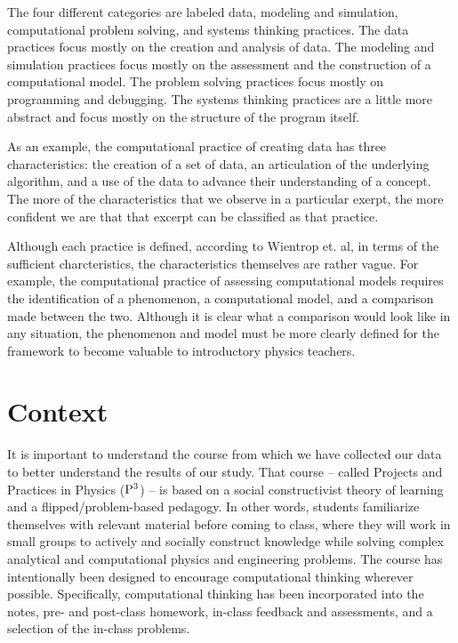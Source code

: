\documentclass{msuphddissertation}
\begin{document}
\begin{doublespace}
The four different categories are labeled data, modeling and simulation, computational problem solving, and systems thinking practices.  The data practices focus mostly on the creation and analysis of data.  The modeling and simulation practices focus mostly on the assessment and the construction of a computational model.  The problem solving practices focus mostly on programming and debugging.  The systems thinking practices are a little more abstract and focus mostly on the structure of the program itself.

As an example, the computational practice of creating data has three characteristics: the creation of a set of data, an articulation of the underlying algorithm, and a use of the data to advance their understanding of a concept.  The more of the characteristics that we observe in a particular exerpt, the more confident we are that that excerpt can be classified as that practice.

Although each practice is defined, according to Wientrop et. al, in terms of the sufficient charcteristics, the characteristics themselves are rather vague.  For example, the computational practice of assessing computational models requires the identification of a phenomenon, a computational model, and a comparison made between the two.  Although it is clear what a comparison would look like in any situation, the phenomenon and model must be more clearly defined for the framework to become valuable to introductory physics teachers.

%
%

\chapter{Context}\label{CH3:Context}

It is important to understand the course from which we have collected our data to better understand the results of our study.  That course -- called Projects and Practices in Physics (${\rm P}^{3}$) -- is based on a social constructivist theory of learning and a flipped/problem-based pedagogy.  In other words, students familiarize themselves with relevant material before coming to class, where they will work in small groups to actively and socially construct knowledge while solving complex analytical and computational physics and engineering problems.  The course has intentionally been designed to encourage computational thinking wherever possible.  Specifically, computational thinking has been incorporated into the notes, pre- and post-class homework, in-class feedback and assessments, and a selection of the in-class problems.


\end{doublespace}
\end{document}
